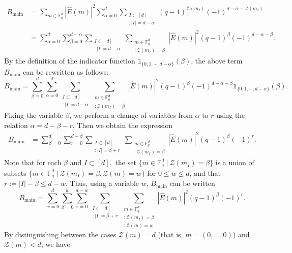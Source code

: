 \documentclass[a4paper,11pt]{amsart}
\numberwithin{equation}{section}
\begin{document}
\begin{align*}
B_{\text{main}} 
&=
\sum_{m \in \mathbb{F}_q^d} |\widehat{E}(m)|^2 \sum_{\alpha=0}^{d} \sum_{\substack{I \subset [d] \\ :|I| = d-\alpha}} (q-1)^{\mathcal{Z}(m_I)} (-1)^{d-\alpha-\mathcal{Z}(m_I)}\\
&= 
\sum_{\alpha=0}^{d} \sum_{\beta=0}^{d-\alpha} \sum_{\substack{I \subset [d] \\ :|I|=d-\alpha}} \sum_{\substack{m \in \mathbb{F}_q^d \\ :\mathcal{Z}(m_I)=\beta}} |\widehat{E}(m)|^2 (q-1)^\beta (-1)^{d-\alpha-\beta}.
\end{align*}
By the definition of the indicator function $\mathds{1}_{\{0,1, \cdots, d-\alpha\}} (\beta)$,  the above term $B_{\text{main}}$ can be rewritten as follows:
$$B_{\text{main}}=  \sum_{\beta=0}^{d} \sum_{\alpha=0}^{d}\sum_{\substack{I \subset [d] \\ :|I|=d-\alpha}} \sum_{\substack{m \in \mathbb{F}_q^d \\ :\mathcal{Z}(m_I)=\beta}}|\widehat{E}(m)|^2 (q-1)^\beta (-1)^{d-\alpha-\beta} \mathds{1}_{\{0,1, \cdots, d-\alpha\}} (\beta).$$
Fixing the variable \(\beta\), we perform a change of variables from \(\alpha\) to \(r\) using the relation $\alpha = d-\beta-r$. Then we obtain the expression
\begin{align*}    
B_{\text{main}}
&=\sum_{\beta=0}^{d} \sum_{r=0}^{d-\beta} \sum_{\substack{I \subset [d] \\ :|I|=\beta+r}} \sum_{\substack{m \in \mathbb{F}_q^d \\ :\mathcal{Z}(m_I)=\beta}} |\widehat{E}(m)|^2 (q-1)^\beta (-1)^r.
\end{align*}
Note that for  each $\beta$ and $I\subset [d],$ the set \ensuremath{\{m \in \mathbb F_q^d ~|~ \mathcal{Z}(m_I)=\beta\} } is a union of subsets  $\{m \in \mathbb F_q^d ~|~ \mathcal{Z}(m_I)=\beta, \mathcal{Z}(m)=w \}$ for $0\leq w \leq d$, and that \( r:=|I|-\beta \leq d - w \).
Thus, using a variable $w$,
$B_{\text{main}}$ can be written
\[
B_{\text{main}}
=
\sum_{w = 0}^d \sum_{\beta = 0}^{w} \sum_{r = 0}^{d - w} 
\sum_{\substack{I \subset [d] \\ :|I| = \beta + r }} 
\sum_{\substack{m \in \mathbb{F}_q^d  \\ :\mathcal{Z}(m_I) = \beta \\: \mathcal{Z}(m) = w}} 
|\widehat{E}(m)|^2 (q - 1)^{\beta} (-1)^r.
\]
By distinguishing between the cases \(\mathcal{Z}(m) = d\) (that is, \(m = (0, \dots, 0)\)) and \(\mathcal{Z}(m) < d\), we have
\end{document}
